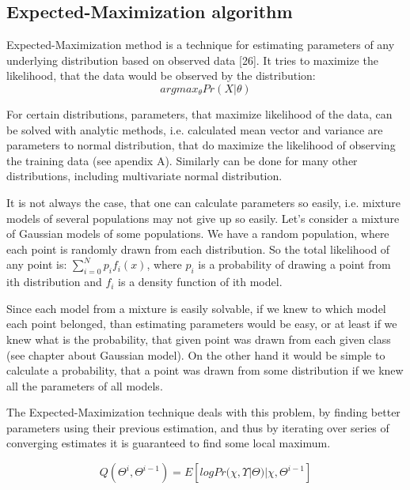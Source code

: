 \documentclass[12pt,a4paper,english]{article}
\begin{document}
\subsection{Expected-Maximization algorithm}

Expected-Maximization method is a technique for estimating parameters of any underlying distribution based on observed data [26]. It tries to maximize the likelihood, that the data would be observed by the distribution: 
\begin{equation}
    argmax_{\theta} Pr(X | \theta)
\end{equation}

For certain distributions, parameters, that maximize likelihood of the data, can be solved with analytic methods, i.e. calculated mean vector and variance are parameters to normal distribution, that do maximize the likelihood of observing the training data (see apendix A).  Similarly can be done for many other distributions, including multivariate normal distribution. \newline

\newpage
It is not always the case, that one can calculate parameters so easily, i.e. mixture models of several populations may not give up so easily.
Let's consider a mixture of Gaussian models of some populations. We have a random population, where each point is randomly drawn from each distribution. 
So the total likelihood of any point is: $\sum_{i=0}^N p_i f_i(x)$, where $p_i$ is a probability of drawing a point from ith distribution and $f_i$ is a density function of ith model. \newline

Since each model from a mixture is easily solvable, if we knew to which model each point belonged, than estimating parameters would be easy,
or at least if we knew what is the probability, that given point was drawn from each given class (see chapter about Gaussian model). \newline
On the other hand it would be simple to calculate a probability, that a point was drawn from some distribution if we knew all the parameters of all models. \newline


The Expected-Maximization technique deals with this problem, by finding better parameters using their previous estimation, and thus by iterating over series of converging estimates it is guaranteed to find some local maximum. \newline


\begin{equation}
    Q(\Theta^i,\Theta^{ i-1})= E[log Pr(\chi, \Upsilon | \Theta) | \chi, \Theta^{i-1}]
\end{equation}
\end{document}
